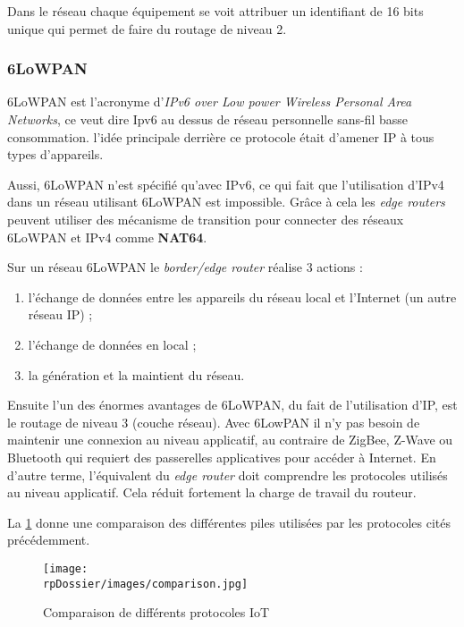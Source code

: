 Dans le réseau chaque équipement se voit attribuer un identifiant de 16 bits unique qui permet de faire du routage de niveau 2.

\subsubsection{6LoWPAN}

6LoWPAN est l'acronyme d'\textit{IPv6 over Low power Wireless Personal Area Networks}, ce veut dire Ipv6 au dessus de réseau personnelle sans-fil basse consommation. l'idée principale derrière ce protocole était d'amener IP à tous types d'appareils. 

Aussi, 6LoWPAN n'est spécifié qu'avec IPv6, ce qui fait que l'utilisation d'IPv4 dans un réseau utilisant 6LoWPAN est impossible. Grâce à cela les \textit{edge routers} peuvent utiliser des mécanisme de transition pour connecter des réseaux 6LoWPAN et IPv4 comme \textbf{NAT64}.

Sur un réseau 6LoWPAN le \textit{border/edge router} réalise 3 actions :

\begin{enumerate}
	\item l'échange de données entre les appareils du réseau local et l'Internet (un autre réseau IP) ;
	\item l'échange de données en local ;
	\item la génération et la maintient du réseau.
\end{enumerate}

Ensuite l'un des énormes avantages de 6LoWPAN, du fait de l'utilisation d'IP, est le routage de niveau 3 (couche réseau). Avec 6LowPAN il n'y pas besoin de maintenir une connexion au niveau applicatif, au contraire de ZigBee, Z-Wave ou Bluetooth qui requiert des passerelles applicatives pour accéder à Internet. En d'autre terme, l'équivalent du \textit{edge router} doit comprendre les protocoles utilisés au niveau applicatif. Cela réduit fortement la charge de travail du routeur.

La \cref{comparison} donne une comparaison des différentes piles utilisées par les protocoles cités précédemment.

\begin{figure}[H]
\centering
\texttt{[image: \\rpDossier/images/comparison.jpg]}
\caption{Comparaison de différents protocoles IoT}
\label{comparison}
\end{figure}


